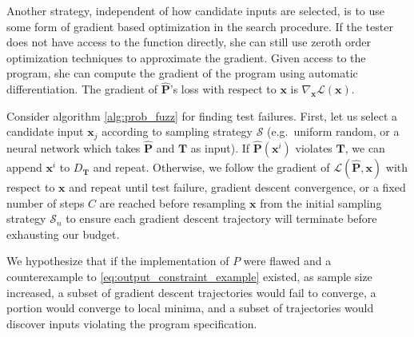 \documentclass[12pt,initial,twoside,maitrise]{dms}
\numberwithin{equation}{section}
\numberwithin{table}{chapter}
\numberwithin{figure}{chapter}
\begin{document}
Another strategy, independent of how candidate inputs are selected, is to use some form of gradient based optimization in the search procedure. If the tester does not have access to the function directly, she can still use zeroth order optimization techniques to approximate the gradient. Given access to the program, she can compute the gradient of the program using automatic differentiation. The gradient of $\mathbf{\hat P}$'s loss with respect to $\mathbf{x}$ is $\nabla_{\mathbf{x}} \mathcal{L}(\mathbf x)$.
%

%
%

Consider algorithm \autoref{alg:prob_fuzz} for finding test failures. First, let us select a candidate input $\mathbf{x}_j$ according to sampling strategy $\mathcal S$ (e.g.\ uniform random, or a neural network which takes $\mathbf{\hat P}$ and $\mathbf T$ as input). If $\mathbf{\hat P}(\mathbf{x}^i)$ violates $\mathbf T$, we can append $\mathbf x^i$ to $D_\mathbf T$ and repeat. Otherwise, we follow the gradient of $\mathcal{L}(\mathbf{\hat P}, \mathbf{x})$ with respect to $\mathbf{x}$ and repeat until test failure, gradient descent convergence, or a fixed number of steps $C$ are reached before resampling $\mathbf{x}$ from the initial sampling strategy $\mathcal S_n$ to ensure each gradient descent trajectory will terminate before exhausting our budget.

We hypothesize that if the implementation of $P$ were flawed and a counterexample to \autoref{eq:output_constraint_example} existed, as sample size increased, a subset of gradient descent trajectories would fail to converge, a portion would converge to local minima, and a subset of trajectories would discover inputs violating the program specification.
\end{document}

